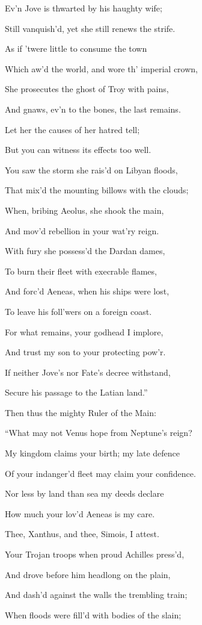 Ev’n Jove is thwarted by his haughty wife;

Still vanquish’d, yet she still renews the strife.

As if ’twere little to consume the town

Which aw’d the world, and wore th’ imperial crown,

She prosecutes the ghost of Troy with pains,

And gnaws, ev’n to the bones, the last remains.

Let her the causes of her hatred tell;

But you can witness its effects too well.

You saw the storm she rais’d on Libyan floods,

That mix’d the mounting billows with the clouds;

When, bribing Aeolus, she shook the main,

And mov’d rebellion in your wat’ry reign.

With fury she possess’d the Dardan dames,

To burn their fleet with execrable flames,

And forc’d Aeneas, when his ships were lost,

To leave his foll’wers on a foreign coast.

For what remains, your godhead I implore,

And trust my son to your protecting pow’r.

If neither Jove’s nor Fate’s decree withstand,

Secure his passage to the Latian land.”

Then thus the mighty Ruler of the Main:

“What may not Venus hope from Neptune’s reign?

My kingdom claims your birth; my late defence

Of your indanger’d fleet may claim your confidence.

Nor less by land than sea my deeds declare

How much your lov’d Aeneas is my care.

Thee, Xanthus, and thee, Simois, I attest.

Your Trojan troops when proud Achilles press’d,

And drove before him headlong on the plain,

And dash’d against the walls the trembling train;

When floods were fill’d with bodies of the slain;

